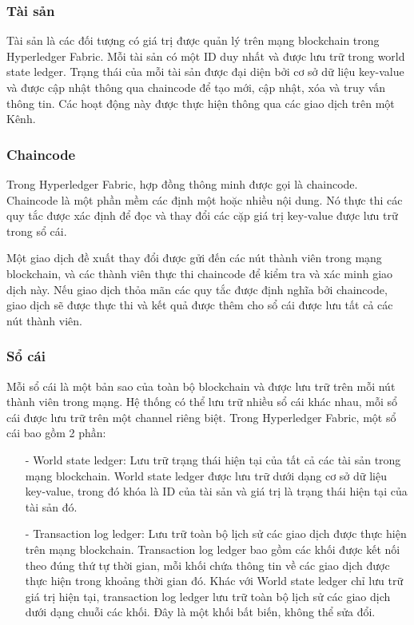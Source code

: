 \subsubsection{Tài sản}
Tài sản là các đối tượng có giá trị được quản lý trên mạng blockchain trong 
Hyperledger Fabric. Mỗi tài sản có một ID duy nhất và được lưu trữ trong world state 
ledger. Trạng thái của mỗi tài sản được đại diện bởi cơ sở dữ liệu key-value và 
được cập nhật thông qua chaincode để tạo mới, cập nhật, xóa và truy vấn thông tin.
Các hoạt động này được thực hiện thông qua các giao dịch trên một Kênh.
\subsubsection{Chaincode}

Trong Hyperledger Fabric, hợp đồng thông minh được gọi là chaincode. Chaincode là 
một phần mềm các định một hoặc nhiều nội dung. Nó thực thi các quy tắc được xác định
để đọc và thay đổi các cặp giá trị key-value được lưu trữ trong sổ cái. 

Một giao dịch đề xuất thay đổi được gửi đến các nút thành viên trong mạng blockchain, và các 
thành viên thực thi chaincode để kiểm tra và xác minh giao dịch này. Nếu giao dịch thỏa mãn các quy 
tắc được định nghĩa bởi chaincode, giao dịch sẽ được thực thi và kết 
quả được thêm cho sổ cái được lưu tất cả các nút thành viên.

\subsubsection{Sổ cái}
Mỗi sổ cái là một bản sao của toàn bộ blockchain và được lưu trữ trên mỗi nút thành viên trong mạng.
Hệ thống có thể lưu trữ nhiều sổ cái khác nhau, mỗi sổ cái được lưu trữ trên một channel riêng biệt. 
Trong Hyperledger Fabric, một sổ cái bao gồm 2 phần:

\begin{itemize}
    \item[-] World state ledger: Lưu trữ trạng thái hiện tại của tất cả các 
    tài sản trong mạng blockchain. World state ledger được lưu trữ dưới dạng cơ sở dữ liệu key-value, trong đó khóa là ID của tài sản và giá trị là trạng thái hiện tại của tài sản đó.
    \item[-] Transaction log ledger: Lưu trữ toàn bộ lịch sử các giao dịch được thực hiện 
    trên mạng blockchain. Transaction log ledger bao gồm các khối được kết nối theo đúng 
    thứ tự thời gian, mỗi khối chứa thông tin về các giao dịch được thực hiện trong khoảng 
    thời gian đó. Khác với World state ledger chỉ lưu trữ giá trị hiện tại, transaction log ledger
    lưu trữ toàn bộ lịch sử các giao dịch dưới dạng chuỗi các khối. Đây là
    một khối bất biến, không thể sửa đổi.
\end{itemize}
